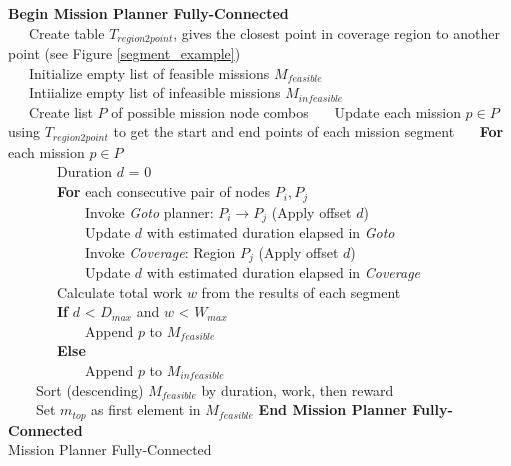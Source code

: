\documentclass{tamuccthesis}
\begin{document}
\begin{algorithm}%
\textbf{Begin Mission Planner Fully-Connected}\\
~~~Create table $T_{region2point}$, gives the closest point in coverage region to another point (see Figure \ref{segment_example}) \\
~~~Initialize empty list of feasible missions $M_{feasible}$ \\
~~~Intiialize empty list of infeasible missions $M_{infeasible}$ \\
~~~Create list $P$ of possible mission node combos 
~~~Update each mission $p \in P$ using $T_{region2point}$ to get the start and end points of each mission segment
~~~\textbf{For} each mission $p \in P$ \\
~~~~~~~Duration $d$ = 0 \\
~~~~~~~\textbf{For} each consecutive pair of nodes $P_i, P_j$ \\ 
~~~~~~~~~~~Invoke \textit{Goto} planner: $P_i \rightarrow P_j$ (Apply offset $d$) \\
~~~~~~~~~~~Update $d$ with estimated duration elapsed in \textit{Goto} \\
~~~~~~~~~~~Invoke \textit{Coverage}: Region $P_j$ (Apply offset $d$) \\
~~~~~~~~~~~Update $d$ with estimated duration elapsed in \textit{Coverage} \\
~~~~~~~Calculate total work $w$ from the results of each segment \\
~~~~~~~\textbf{If} $d$ < $D_{max}$ and $w$ < $W_{max}$ \\
~~~~~~~~~~~Append $p$ to $M_{feasible}$ \\
~~~~~~~\textbf{Else} \\
~~~~~~~~~~~Append $p$ to $M_{infeasible}$ \\
~~~~Sort (descending) $M_{feasible}$ by duration, work, then reward \\
~~~~Set $m_{top}$ as first element in $M_{feasible}$ 
\textbf{End Mission Planner Fully-Connected}\\
\caption{Mission Planner Fully-Connected}
\label{alg:MPFC}
\end{algorithm}
\end{document}
